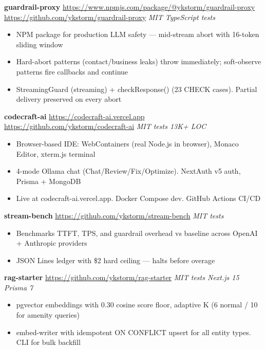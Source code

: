 \documentclass[11pt, a4paper]{article}
\begin{document}
\textbf{guardrail-proxy} \quad
\small\url{https://www.npmjs.com/package/@ykstorm/guardrail-proxy} \quad
\url{https://github.com/ykstorm/guardrail-proxy} \quad
\textit{MIT \cdot TypeScript  tests}
\vspace{1pt}
\begin{itemize}
\item NPM package for production LLM safety --- mid-stream abort with 16-token sliding window
\item Hard-abort patterns (contact/business leaks) throw immediately; soft-observe patterns fire callbacks and continue
\item StreamingGuard (streaming) + checkResponse() (23 CHECK cases). Partial delivery preserved on every abort
\end{itemize}
\vspace{4pt}

\textbf{codecraft-ai} \quad
\small\url{https://codecraft-ai.vercel.app} \quad
\url{https://github.com/ykstorm/codecraft-ai} \quad
\textit{MIT  tests \cdot 13K+ LOC}
\vspace{1pt}
\begin{itemize}
\item Browser-based IDE: WebContainers (real Node.js in browser), Monaco Editor, xterm.js terminal
\item 4-mode Ollama chat (Chat/Review/Fix/Optimize). NextAuth v5 auth, Prisma + MongoDB
\item Live at codecraft-ai.vercel.app. Docker Compose dev. GitHub Actions CI/CD
\end{itemize}
\vspace{4pt}

\textbf{stream-bench} \quad
\small\url{https://github.com/ykstorm/stream-bench} \quad
\textit{MIT  tests}
\vspace{1pt}
\begin{itemize}
\item Benchmarks TTFT, TPS, and guardrail overhead vs baseline across OpenAI + Anthropic providers
\item JSON Lines ledger with \$2 hard ceiling --- halts before overage
\end{itemize}
\vspace{4pt}

\textbf{rag-starter} \quad
\small\url{https://github.com/ykstorm/rag-starter} \quad
\textit{MIT  tests \cdot Next.js 15 \cdot Prisma 7}
\vspace{1pt}
\begin{itemize}
\item pgvector embeddings with 0.30 cosine score floor, adaptive K (6 normal / 10 for amenity queries)
\item embed-writer with idempotent ON CONFLICT upsert for all entity types. CLI for bulk backfill
\end{itemize}
\vspace{4pt}
\end{document}
